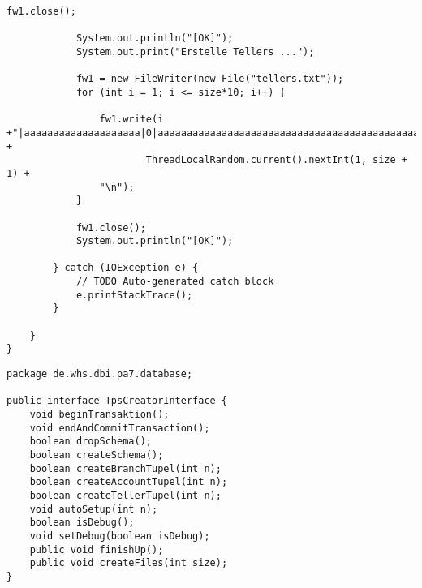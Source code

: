 \begin{lstlisting}[caption={tpsCreator (optimiert)}, label={lst:tpsv2}]
			fw1.close();

			System.out.println("[OK]");
			System.out.print("Erstelle Tellers ...");

			fw1 = new FileWriter(new File("tellers.txt"));
			for (int i = 1; i <= size*10; i++) {
				
				fw1.write(i +"|aaaaaaaaaaaaaaaaaaaa|0|aaaaaaaaaaaaaaaaaaaaaaaaaaaaaaaaaaaaaaaaaaaaaaaaaaaaaaaaaaaaaaaaaaaa|" +
						ThreadLocalRandom.current().nextInt(1, size + 1) +
				"\n");
			}
			
			fw1.close();
			System.out.println("[OK]");
			
		} catch (IOException e) {
			// TODO Auto-generated catch block
			e.printStackTrace();
		}
		
	}
}
\end{lstlisting}

\begin{lstlisting}[caption={TpsCreatorInterface (optimiert)}, label={lst:tpsiv2}]
package de.whs.dbi.pa7.database;

public interface TpsCreatorInterface {
	void beginTransaktion();
	void endAndCommitTransaction();
	boolean dropSchema();
	boolean createSchema();
	boolean createBranchTupel(int n);
	boolean createAccountTupel(int n);
	boolean createTellerTupel(int n);
	void autoSetup(int n);
	boolean isDebug();
	void setDebug(boolean isDebug);
	public void finishUp();
	public void createFiles(int size);
}
\end{lstlisting}

